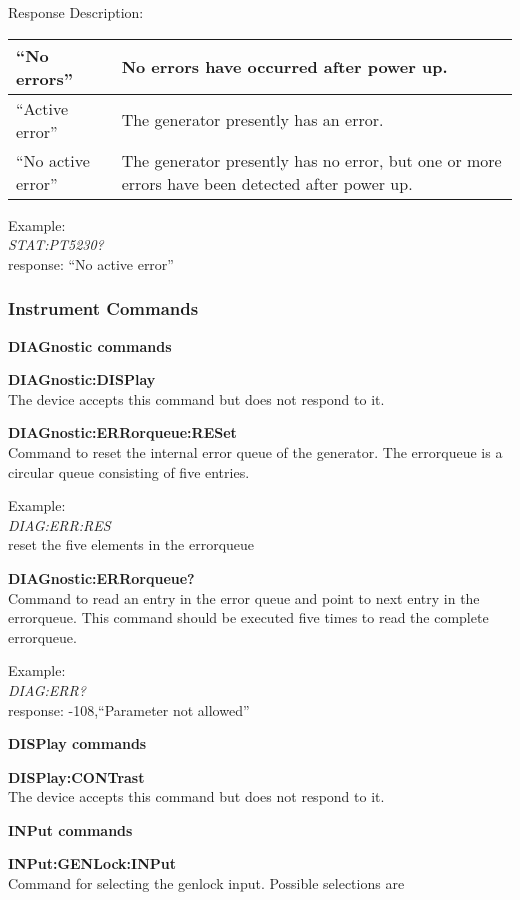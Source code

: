 Response Description:

\begin{tabular}{|p{10em}|p{22em}|}
\hline
``No errors'' 			& No errors have occurred after power up. \\ \hline
``Active error''		& The generator presently has an error. \\ \hline
``No active error''	& The generator presently has no error, but one or more errors have been detected after power up. \\
\hline
\end{tabular}

Example:\\
\textit{STAT:PT5230?}\\
response: ``No active error''

\subsubsection{Instrument Commands}

\textbf{DIAGnostic commands}

\textbf{DIAGnostic:DISPlay}\\
The device accepts this command but does not respond to it.

\textbf{DIAGnostic:ERRorqueue:RESet}\\
Command to reset the internal error queue of the generator. The errorqueue is a circular queue consisting of five entries.

Example:\\
\textit{DIAG:ERR:RES}\\
reset the five elements in the errorqueue

\textbf{DIAGnostic:ERRorqueue?}\\
Command to read an entry in the error queue and point to next entry in the errorqueue. This command should be executed five times to read the complete errorqueue.

Example:\\
\textit{DIAG:ERR?}\\
response: -108,``Parameter not allowed''

\textbf{DISPlay commands}

\textbf{DISPlay:CONTrast}\\
The device accepts this command but does not respond to it.

\textbf{INPut commands}

\textbf{INPut:GENLock:INPut}\\
Command for selecting the genlock input. Possible selections are 

